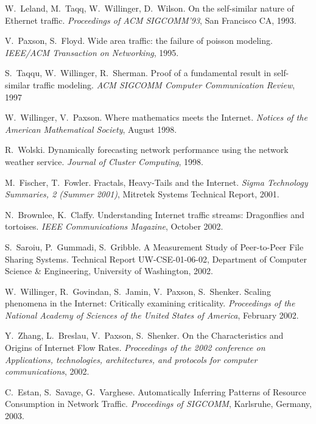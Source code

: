 \documentclass{article}
\newcounter{myEnumCounter}
\newcounter{mySaveCounter}
\renewenvironment{enumerate}{%
  \begin{list}{[\arabic{myEnumCounter}]}{\usecounter{myEnumCounter}%
  \setcounter{myEnumCounter}{\value{mySaveCounter}}}
  }{%
  \setcounter{mySaveCounter}{\value{myEnumCounter}}\end{list}%
}
\begin{document}
\begin{enumerate}

W.~Leland, M.~Taqq, W.~Willinger, D.~Wilson.
On the self-similar nature of Ethernet traffic.
\textit{Proceedings of ACM SIGCOMM'93}, San Francisco CA, 1993.

V.~Paxson, S.~Floyd.
Wide area traffic: the failure of poisson modeling.
\textit{IEEE/ACM Transaction on Networking}, 1995.

S.~Taqqu, W.~Willinger, R.~Sherman.
Proof of a fundamental result in self-similar traffic modeling.
\textit{ACM SIGCOMM Computer Communication Review}, 1997

W.~Willinger, V.~Paxson.
Where mathematics meets the Internet.
\textit{Notices of the American Mathematical Society}, August 1998.

R.~Wolski.
Dynamically forecasting network performance using the network weather service.
\textit{Journal of Cluster Computing}, 1998.

M.~Fischer, T.~Fowler.
Fractals, Heavy-Tails and the Internet.
\textit{Sigma Technology Summaries, 2 (Summer 2001)}, Mitretek Systems Technical Report, 2001.

N.~Brownlee, K.~Claffy.
Understanding Internet traffic streams: Dragonflies and tortoises.
\textit{IEEE Communications Magazine}, October 2002.

S.~Saroiu, P.~Gummadi, S.~Gribble.
A Measurement Study of Peer-to-Peer File Sharing Systems.
Technical Report UW-CSE-01-06-02, Department of Computer Science \& Engineering, University of Washington, 2002.

W.~Willinger, R.~Govindan, S.~Jamin, V.~Paxson, S.~Shenker.
Scaling phenomena in the Internet: Critically examining criticality.
\textit{Proceedings of the National Academy of Sciences of the United States of America}, February 2002.

Y.~Zhang, L.~Breslau, V.~Paxson, S.~Shenker.
On the Characteristics and Origins of Internet Flow Rates.
\textit{Proceedings of the 2002 conference on Applications, technologies, architectures, and protocols for computer communications}, 2002.

C.~Estan, S.~Savage, G.~Varghese.
Automatically Inferring Patterns of Resource Consumption in Network Traffic.
\textit{Proceedings of SIGCOMM}, Karlsruhe, Germany, 2003.


\end{enumerate}
\end{document}

